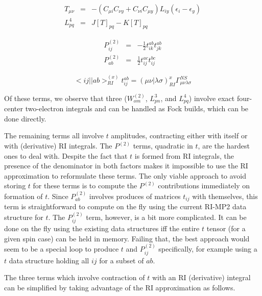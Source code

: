 \documentclass[fleqn,12pt]{article}
\newcommand{\half}{\frac{1}{2}}
\newcommand{\bra}{<\!}
\newcommand{\ket}{\!>}
\newcommand{\tijab}{{t_{ij}^{ab}}}
\newcommand{\Ptwo}{P^{(2)}}
\newcommand{\Wtwo}{W^{(2)}}
\newcommand{\intari}[2]{\bra #1 || #2 \ket_{RI}}
\newcommand{\intmri}[2]{( #1 | #2 )_{RI}}
\begin{document}
\begin{changebar}
\begin{eqnarray}
  T_{\mu \nu} & = & - \left(C_{\mu i} C_{\nu y} + C_{\nu i} C_{\mu y}
  \right) L_{iy} \left( \epsilon_i - \epsilon_y \right) \\ L^4_{pq} &
  = & J[T]_{pq} - K[T]_{pq}
\end{eqnarray}

\begin{eqnarray}
  \Ptwo_{ij} & = & -\half t_{ik}^{ab} t_{jk}^{ab} \\
  \Ptwo_{ab} & = & \half t_{ij}^{ac} t_{ij}^{bc} 
\end{eqnarray}

\begin{equation}
\intari{ij}{ab}^{(x)} \tijab 
 = \intmri{\mu \nu}{\lambda \sigma}^{x} \Gamma^{NS}_{\mu\nu\lambda\sigma}
\end{equation}

Of these terms, we observe that three ($\Wtwo_{om}$, $L^{3}_{pn}$, and
$L^{4}_{pq}$) involve exact four-center two-electron integrals and can
be handled as Fock builds, which can be done directly.

The remaining terms all involve $t$ amplitudes, contracting either
with itself or with (derivative) RI integrals.  The $P^{(2)}$ terms,
quadratic in $t$, are the hardest ones to deal with.  Despite the fact
that $t$ is formed from RI integrals, the presence of the denominator
in both factors makes it impossible to use the RI approximation to
reformulate these terms.  The only viable approach to avoid storing
$t$ for these terms is to compute the $P^{(2)}$ contributions
immediately on formation of $t$.  Since $P^{(2)}_{ab}$ involves
produces of matrices $t_{ij}$ with themselves, this term is
straightforward to compute on the fly using the current RI-MP2 data
structure for $t$.  The $P^{(2)}_{ij}$ term, however, is a bit more
complicated.  It can be done on the fly using the existing data
structures iff the entire $t$ tensor (for a given spin case) can be
held in memory.  Failing that, the best approach would seem to be a
special loop to produce $t$ and $P^{(2)}_{ij}$ specifically, for
example using a $t$ data structure holding all $ij$ for a subset of
$ab$.

The three terms which involve contraction of $t$ with an RI
(derivative) integral can be simplified by taking advantage of the RI
approximation as follows.


\end{changebar}
\end{document}
